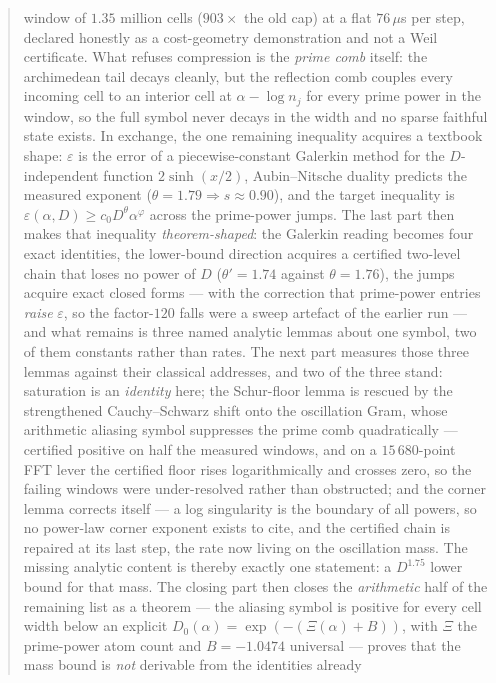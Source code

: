 \documentclass[11pt,a4paper]{article}
\begin{document}
\begin{abstract}
window of $1.35$ million cells ($903\times$ the old cap) at a flat $76\,\mu$s per step, declared
honestly as a cost-geometry demonstration and not a Weil certificate. What refuses compression
is the \emph{prime comb} itself: the archimedean tail decays cleanly, but the reflection comb
couples every incoming cell to an interior cell at $\alpha-\log n_j$ for every prime power in
the window, so the full symbol never decays in the width and no sparse faithful state exists.
In exchange, the one remaining inequality acquires a textbook shape: $\varepsilon$ is the error
of a piecewise-constant Galerkin method for the $D$-independent function $2\sinh(x/2)$,
Aubin--Nitsche duality predicts the measured exponent
($\theta=1.79\Rightarrow s\approx0.90$), and the target inequality is
$\varepsilon(\alpha,D)\ge c_0D^{\theta}\alpha^{\varphi}$ across the prime-power jumps. The last
part then makes that inequality \emph{theorem-shaped}: the Galerkin reading becomes four exact
identities, the lower-bound direction acquires a certified two-level chain that loses no power
of $D$ ($\theta'=1.74$ against $\theta=1.76$), the jumps acquire exact closed forms --- with the
correction that prime-power entries \emph{raise} $\varepsilon$, so the factor-$120$ falls were a
sweep artefact of the earlier run --- and what remains is three named analytic lemmas about one
symbol, two of them constants rather than rates. The next part measures those three lemmas
against their classical addresses, and two of the three stand: saturation is an \emph{identity}
here; the Schur-floor lemma is rescued by the strengthened Cauchy--Schwarz shift onto the
oscillation Gram, whose arithmetic aliasing symbol suppresses the prime comb quadratically ---
certified positive on half the measured windows, and on a $15\,680$-point FFT lever the
certified floor rises logarithmically and crosses zero, so the failing windows were
under-resolved rather than obstructed; and the corner lemma corrects itself --- a log
singularity is the boundary of all powers, so no power-law corner exponent exists to cite, and
the certified chain is repaired at its last step, the rate now living on the oscillation mass.
The missing analytic content is thereby exactly one statement: a $D^{1.75}$ lower bound for
that mass. The closing part then closes the \emph{arithmetic} half of the remaining list as a
theorem --- the aliasing symbol is positive for every cell width below an explicit
$D_0(\alpha)=\exp(-(\Xi(\alpha)+B))$, with $\Xi$ the prime-power atom count and $B=-1.0474$
universal --- proves that the mass bound is \emph{not} derivable from the identities already

\end{abstract}
\end{document}
